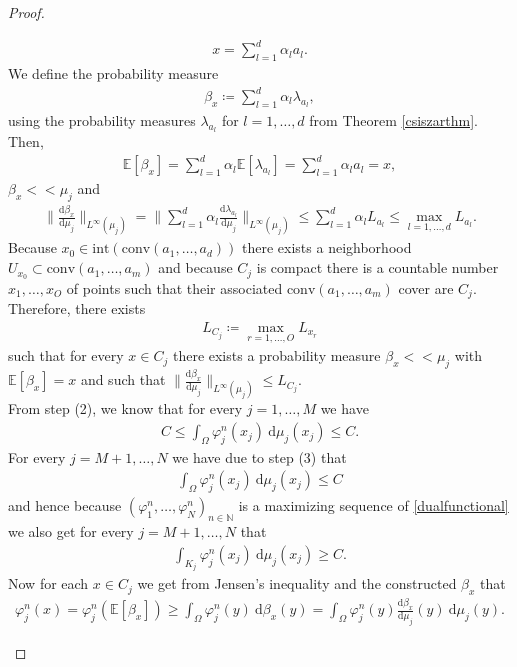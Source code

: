 \documentclass[10pt,a4paper]{amsart}
\newcommand{\NN}{\mathbb{N}}
\newcommand{\EE}{\mathbb{E}}
\newcommand{\dd}{\mathrm{d}}
\begin{document}
\begin{proof}
\begin{enumerate}
	\begin{gather*}
		x=\sum_{l=1}^d\alpha_la_l.
	\end{gather*}
	We define the probability measure
	\begin{gather*}
		\beta_{x}\coloneqq\sum_{l=1}^d\alpha_l\lambda_{a_l},
	\end{gather*}
	using the probability measures $\lambda_{a_l}$ for $l=1,\dots,d$ from Theorem \ref{csiszarthm}. Then,
	\begin{gather*}
		\EE[\beta_x]=\sum_{l=1}^d\alpha_l\EE[\lambda_{a_l}]=\sum_{l=1}^d\alpha_la_l=x,
	\end{gather*}
	$\beta_x<<\mu_j$ and
	\begin{gather*}
		\Big\|\frac{\dd\beta_x}{\dd\mu_j}\Big\|_{L^\infty(\mu_j)}=\Big\|\sum_{l=1}^d\alpha_l\frac{\dd\lambda_{a_l}}{\dd\mu_j}\Big\|_{L^\infty(\mu_j)}\leq \sum_{l=1}^d\alpha_lL_{a_l}\leq\max_{l=1,\dots,d}L_{a_l}.
	\end{gather*}
	Because $x_0\in\text{int}(\text{conv}(a_1,\dots,a_d))$ there exists a neighborhood $U_{x_0}\subset\text{conv}(a_1,\dots,a_m)$ and because $C_j$ is compact there is a countable number $x_1,\dots,x_O$ of points such that their associated $\text{conv}(a_1,\dots,a_m)$ cover are $C_j$. Therefore, there exists
	\begin{gather*}
		L_{C_j}\coloneqq \max_{r=1,\dots,O} L_{x_r}
	\end{gather*}
	such that for every $x\in C_j$ there exists a probability measure $\beta_x<<\mu_j$ with $\EE[\beta_x]=x$ and such that $\|\frac{\dd\beta_x}{\dd\mu_j}\|_{L^\infty(\mu_j)}\leq L_{C_j}$.\\
	From step (2), we know that for every $j=1,\dots,M$ we have
	\begin{gather*}
		C\leq \int_\Omega\varphi_j^n(x_j)\ \dd\mu_j(x_j)\leq C.
	\end{gather*}
	For every $j=M+1,\dots,N$ we have due to step (3) that 
	\begin{gather*}
		\int_{\Omega}\varphi_j^n(x_j)\ \dd\mu_j(x_j)\leq C
	\end{gather*}
	and hence because $(\varphi_1^n,\dots,\varphi_N^n)_{n\in\NN}$ is a maximizing sequence of \eqref{dualfunctional} we also get for every $j=M+1,\dots,N$ that 
	\begin{gather*}
		\int_{K_j}\varphi_j^n(x_j)\ \dd\mu_j(x_j)\geq C.
	\end{gather*}
	Now for each $x\in C_j$ we get from Jensen's inequality and the constructed $\beta_x$ that
	\begin{gather*}
		\varphi_j^n(x)=\varphi_j^n(\EE[\beta_x])\geq \int_\Omega \varphi_j^n(y)\ \dd\beta_x(y)=\int_\Omega \varphi_j^n(y) \frac{\dd\beta_x}{\dd\mu_j}(y)\ \dd\mu_j(y).

\end{gather*}
\end{enumerate}
\end{proof}
\end{document}
